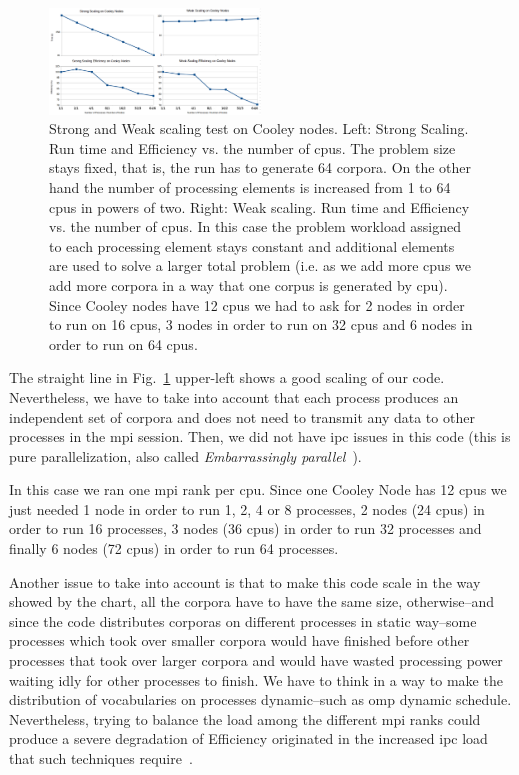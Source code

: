 \documentclass[10pt,journal,compsoc]{IEEEtran}
\begin{document}
\begin{figure}[h!]
    \centering
    \includegraphics[width=0.5\textwidth]{CorporaGenerationScaling.png}
    \caption{Strong and Weak scaling test on Cooley nodes. Left: Strong Scaling. Run time and Efficiency vs. the number of \glspl{cpu}. The problem size stays fixed, that is, the run has to generate 64 corpora. On the other hand the number of processing elements is increased from 1 to 64 \glspl{cpu} in powers of two. Right: Weak scaling. Run time and Efficiency vs. the number of \glspl{cpu}. In this case the problem workload assigned to each processing element stays constant and additional elements are used to solve a larger total problem (i.e. as we add more \glspl{cpu} we add more corpora in a way that one corpus is generated by \gls{cpu}). Since Cooley nodes have 12 \glspl{cpu} we had to ask for 2 nodes in order to run on 16 \glspl{cpu}, 3 nodes in order to run on 32 \glspl{cpu} and 6 nodes in order to run on 64 \glspl{cpu}.}
    \label{fig:CorporaGenerationScaling}
\end{figure}

The straight line in Fig.~\ref{fig:CorporaGenerationScaling} upper-left shows a good scaling of our code. Nevertheless, we have to take into account that each process produces an independent set of corpora and does not need to transmit any data to other processes in the \gls{mpi} session. Then, we did not have \gls{ipc} issues in this code (this is pure parallelization, also called \emph{Embarrassingly parallel}~\cite{noauthor_embarrassingly_2018}).

In this case we ran one \gls{mpi} rank per \gls{cpu}. Since one Cooley Node has 12 \glspl{cpu} we just needed 1 node in order to run 1, 2, 4 or 8 processes, 2 nodes (24 \glspl{cpu}) in order to run 16 processes, 3 nodes (36 \glspl{cpu}) in order to run 32 processes and finally 6 nodes (72 \glspl{cpu}) in order to run 64 processes.

Another issue to take into account is that to make this code scale in the way showed by the chart, all the corpora have to have the same size, otherwise--and since the code distributes corporas on different processes in static way--some processes which took over smaller corpora would have finished before other processes that took over larger corpora and would have wasted processing power waiting idly for other processes to finish. We have to think in a way to make the distribution of vocabularies on processes dynamic--such as \gls{omp} dynamic schedule. Nevertheless, trying to balance the load among the different \gls{mpi} ranks could produce a severe degradation of Efficiency originated in the increased \gls{ipc} load that such techniques require~\cite{hu2012biophysically}.
\end{document}

